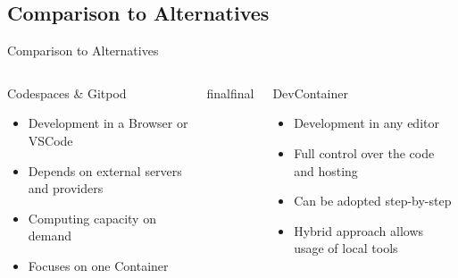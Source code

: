 \documentclass{beamer}
\def\final{final}
\def\status{final}
\begin{document}
\subsection{Comparison to Alternatives}
\begin{frame}
  \vspace{-.7cm}
  \begin{center}
    \Large Comparison to Alternatives
  \end{center}


  \begin{columns}[totalwidth=\textwidth]
    \begin{column}{0.45\textwidth}
      \begin{center}
        {\large\color{uos-red-full}Codespaces \& Gitpod}
      \end{center}
      \begin{itemize}
        \setlength\itemsep{0.6em}
        \item Development in a Browser or VSCode
        \item Depends on external servers and providers
        \item Computing capacity on demand
        \item Focuses on one Container
      \end{itemize}
    \end{column}

    \ifx\status\final{}
      \pause{}
    \fi
    \hspace{1cm}
    \begin{column}{0.45\textwidth}
      \begin{center}
        {\large\color{uos-red-full}DevContainer}
      \end{center}
      \begin{itemize}
        \setlength\itemsep{0.6em}
        \item Development in any editor
        \item Full control over the code and hosting
        \item Can be adopted step-by-step
        \item Hybrid approach allows usage of local tools
      \end{itemize}
    \end{column}


  \end{columns}
\end{frame}
\end{document}
